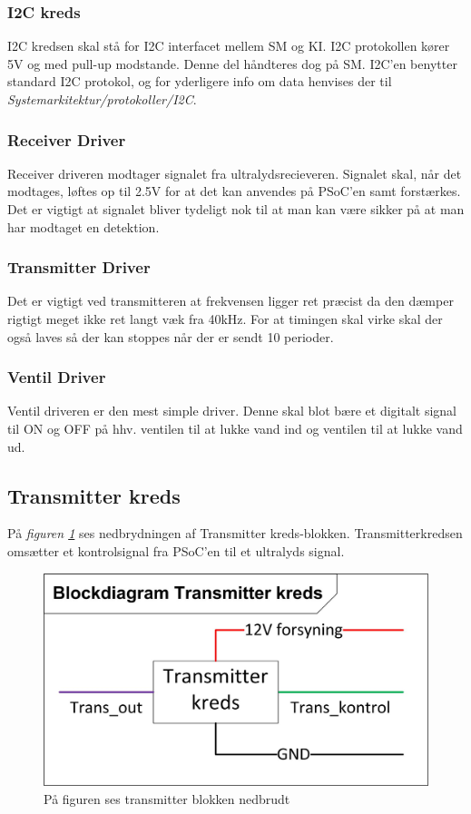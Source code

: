 \subsubsection{I2C kreds}
I2C kredsen skal stå for I2C interfacet mellem SM og KI. I2C protokollen kører 5V og med pull-up modstande. Denne del håndteres dog på SM. I2C'en benytter standard I2C protokol, og for yderligere info om data henvises der til \textit{Systemarkitektur/protokoller/I2C}.
\subsubsection{Receiver Driver}
Receiver driveren modtager signalet fra ultralydsrecieveren. Signalet skal, når det modtages, løftes op til 2.5V for at det kan anvendes på PSoC'en samt forstærkes. Det er vigtigt at signalet bliver tydeligt nok til at man kan være sikker på at man har modtaget en detektion. 
\subsubsection{Transmitter Driver}
Det er vigtigt ved transmitteren at frekvensen ligger ret præcist da den dæmper rigtigt meget ikke ret langt væk fra 40kHz. For at timingen skal virke skal der også laves så der kan stoppes når der er sendt 10 perioder.
\subsubsection{Ventil Driver}
Ventil driveren er den mest simple driver. Denne skal blot bære et digitalt signal til ON og OFF på hhv. ventilen til at lukke vand ind og ventilen til at lukke vand ud.

\subsection{Transmitter kreds}
På \textit{figuren \ref{fig:transmitterblok}} ses nedbrydningen af Transmitter kreds-blokken. Transmitterkredsen omsætter et kontrolsignal fra PSoC'en til et ultralyds signal.
\begin{figure}[H]
\centering
\includegraphics[scale=1]{billeder/transmitterblok}
\caption{På figuren ses transmitter blokken nedbrudt}
\label{fig:transmitterblok}
\end{figure}
